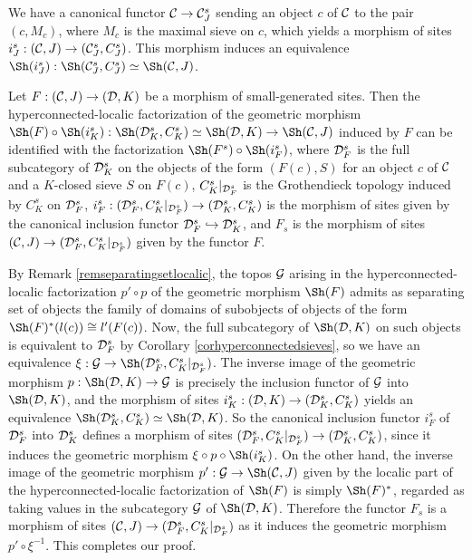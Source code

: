 \documentclass[a4paper,12pt]{article}
\begin{document}
We have a canonical functor ${\cal C}\to {\cal C}_{J}^{s}$ sending an object $c$ of $\cal C$ to the pair $(c, M_{c})$, where $M_{c}$ is the maximal sieve on $c$, which yields a morphism of sites $i_{J}^{s}:({\cal C}, J)\to ({\cal C}_{J}^{s}, C_{J}^{s})$. This morphism induces an equivalence $\Sh(i_{J}^{s}):\Sh({\cal C}_{J}^{s}, C_{J}^{s}) \simeq \Sh({\cal C}, J)$.  

\begin{theorem}\label{thmhyperconnectedlocalicfactorization}
	Let $F:({\cal C}, J)\to ({\cal D}, K)$ be a morphism of small-generated sites. Then the hyperconnected-localic factorization of the geometric morphism $\Sh(F)\circ \Sh(i_{K}^{s}):\Sh({\cal D}_{K}^{s}, C_{K}^{s})\simeq \Sh({\cal D}, K) \to \Sh({\cal C}, J)$ induced by $F$ can be identified with the factorization $\Sh(F^{s})\circ \Sh(i_{F}^{s})$, where
	${\cal D}_{F}^{s}$ is the full subcategory of ${\cal D}_{K}^{s}$ on the objects of the form $(F(c), S)$ for an object $c$ of $\cal C$ and a $K$-closed sieve $S$ on $F(c)$, $C_{K}^{s}|_{{\cal D}_{F}^{s}}$ is the Grothendieck topology induced by $C_{K}^{s}$ on ${\cal D}_{F}^{s}$, $i_{F}^{s}:({\cal D}_{F}^{s}, C_{K}^{s}|_{{\cal D}_{F}^{s}})\to ({\cal D}_{K}^{s}, C_{K}^{s})$ is the morphism of sites given by the canonical inclusion functor ${\cal D}_{F}^{s}\hookrightarrow {\cal D}_{K}^{s}$, and $F_{s}$ is the morphism of sites $({\cal C}, J)\to ({\cal D}_{F}^{s}, C_{K}^{s}|_{{\cal D}_{F}^{s}})$ given by the functor $F$.
\end{theorem}

\begin{proofs}
		By Remark \ref{remseparatingsetlocalic}, the topos $\cal G$ arising in the hyperconnected-localic factorization $p'\circ p$ of the geometric morphism $\Sh(F)$ admits as separating set of objects the family of domains of subobjects of objects of the form $\Sh(F)^{\ast}(l(c))\cong l'(F(c))$. Now, the full subcategory of $\Sh({\cal D}, K)$ on such objects is equivalent to ${\cal D}_{F}^{s}$ by Corollary \ref{corhyperconnectedsieves}, so we have an equivalence $\xi:{\cal G}\to  \Sh({\cal D}_{F}^{s}, C_{K}^{s}|_{{\cal D}_{F}^{s}})$. The inverse image of the geometric morphism $p:\Sh({\cal D}, K)\to {\cal G}$ is precisely the inclusion functor of $\cal G$ into $\Sh({\cal D}, K)$, and the morphism of sites $i_{K}^{s}:({\cal D}, K)\to ({\cal D}_{K}^{s}, C_{K}^{s})$ yields an equivalence $\Sh({\cal D}_{K}^{s}, C_{K}^{s})\simeq \Sh({\cal D}, K)$.  So the canonical inclusion functor $i_{F}^{s}$ of ${\cal D}_{F}^{s}$ into ${\cal D}_{K}^{s}$ defines a morphism of sites $({\cal D}_{F}^{s}, C_{K}^{s}|_{{\cal D}_{F}^{s}})\to ({\cal D}_{K}^{s}, C_{K}^{s})$, since it induces the geometric morphism $\xi \circ p\circ \Sh(i_{K}^{s})$. On the other hand, the inverse image of the geometric morphism $p':{\cal G}\to \Sh({\cal C}, J)$ given by the localic part of the hyperconnected-localic factorization of $\Sh(F)$ is simply $\Sh(F)^{\ast}$, regarded as taking values in the subcategory $\cal G$ of $\Sh({\cal D}, K)$. Therefore the functor $F_{s}$ is a morphism of sites $({\cal C}, J)\to ({\cal D}_{F}^{s}, C_{K}^{s}|_{{\cal D}_{F}^{s}})$ as it induces the geometric morphism $p'\circ \xi^{-1}$.  
		This completes our proof. 
\end{proofs}
	
\end{document}
